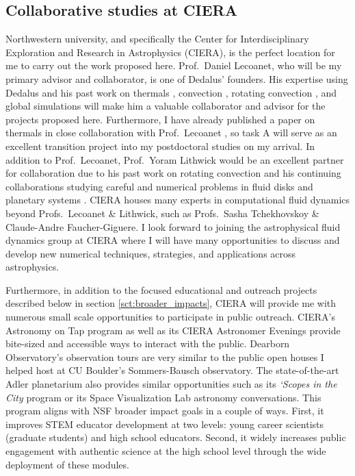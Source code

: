 \documentclass[11pt, preprint]{aastex}
\begin{document}
\subsection*{Collaborative studies at CIERA}
\vspace{-0.3cm}
\label{sct:ciera}
Northwestern university, and specifically the Center for Interdisciplinary Exploration and Research in Astrophysics (CIERA), is the perfect location for me to carry out the work proposed here.
Prof.~Daniel Lecoanet, who will be my primary advisor and collaborator, is one of Dedalus' founders.
His expertise using Dedalus and his past work on thermals \citep{lecoanet&jeevanjee2019, tarshis&all2018}, convection \citep{lecoanet&quataert2013, lecoanet&all2014, couston&all2017}, rotating convection \citep{couston&all2019}, and global simulations \citep{lecoanet&all2018} will make him a valuable collaborator and advisor for the projects proposed here.
Furthermore, I have already published a paper on thermals in close collaboration with Prof.~Lecoanet \citep{andersLB2019}, so task A will serve as an excellent transition project into my postdoctoral studies on my arrival.
In addition to Prof.~Lecoanet, Prof.~Yoram Lithwick would be an excellent partner for collaboration due to his past work on rotating convection \citep{BDLithwick2014} and his continuing collaborations studying careful and numerical problems in fluid disks \citep{LDLithwick2019} and planetary systems \citep{hadden&lithwick2018}.
CIERA houses many experts in computational fluid dynamics beyond Profs.~Lecoanet \& Lithwick, such as Profs.~Sasha Tchekhovskoy \& Claude-Andre Faucher-Giguere.
I look forward to joining the astrophysical fluid dynamics group at CIERA where I will have many opportunities to discuss and develop new numerical techniques, strategies, and applications across astrophysics.


Furthermore, in addition to the focused educational and outreach projects described below in section \ref{sct:broader_impacts}, CIERA will provide me with numerous small scale opportunities to participate in public outreach.
CIERA's Astronomy on Tap program as well as its CIERA Astronomer Evenings provide bite-sized and accessible ways to interact with the public.
Dearborn Observatory's observation tours are very similar to the public open houses I helped host at CU Boulder's Sommers-Bausch observatory.
The state-of-the-art Adler planetarium also provides similar opportunities such as its \emph{`Scopes in the City} program or its Space Visualization Lab astronomy conversations.
This program aligns with NSF broader impact goals in a couple of ways.
First, it improves STEM educator development at two levels: young career scientists (graduate students) and high school educators.
Second, it widely increases public engagement with authentic science at the high school level through the wide deployment of these modules.
\end{document}
